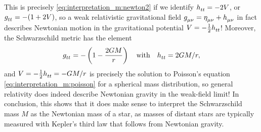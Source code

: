 This is precisely \cref{eq:interpretation_m:newton2} if we identify $h\indices{_t_t} = -2 V$, or $g\indices{_t_t} = -(1+2V)$, so a weak relativistic gravitational field $g\indices{_\mu_\nu} = \eta\indices{_\mu_\nu} + h\indices{_\mu_\nu}$ in fact describes Newtonian motion in the gravitational potential $V = -\frac{1}{2} h\indices{_t_t}$!
Moreover, the Schwarzschild metric has the element
\begin{equation}
	g\indices{_t_t} = - \left( 1 - \frac{2 G M}{r} \right)
	\quad \text{with} \quad
	h\indices{_t_t} = 2GM/r ,
	\label{eq:weak_field_limit:schwarzschild_metric_tt}
\end{equation}
and $V = -\frac{1}{2} h\indices{_t_t} = -G M / r$ is precisely the solution to Poisson's equation \eqref{eq:interpretation_m:poisson} for a spherical mass distribution, so general relativity does indeed describe Newtonian gravity in the weak-field limit!
In conclusion, this shows that it does make sense to interpret the Schwarzschild mass $M$ as the Newtonian mass of a star, as masses of distant stars are typically measured with Kepler's third law that follows from Newtonian gravity. \cite[box 23.1]{ref:mtw}

